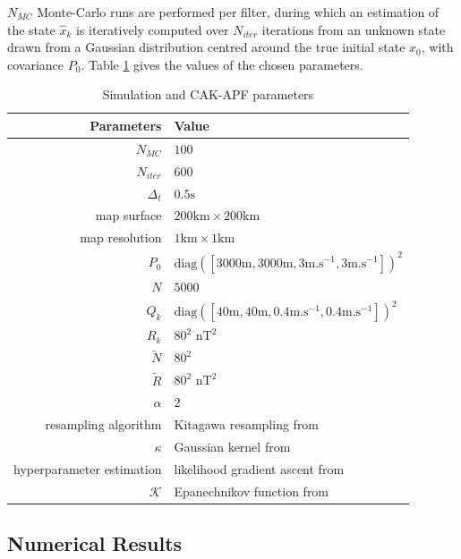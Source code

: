\documentclass[conference]{IEEEtran}
\begin{document}
$N_{MC}$ Monte-Carlo runs are performed per filter, during which an estimation of the state $\hat{x}_k$ is iteratively computed over $N_{iter}$ iterations from an unknown state drawn from a Gaussian distribution centred around the true initial state $x_0$, with covariance $P_0$. Table \ref{tab:parameters} gives the values of the chosen parameters.
\begin{table}[ht]
\renewcommand{\arraystretch}{1.1}
\centering \caption{Simulation and CAK-APF parameters} \label{tab:parameters}
\begin{tabular}{r|l}\hline
Parameters&Value\\\hline
$N_{MC}$&$100$\\
$N_{iter}$&$600$\\
$\Delta_t$&$0.5\text{s}$\\
map surface&$200\text{km}\times200\text{km}$\\
map resolution&$1\text{km}\times1\text{km}$\\
$P_0$&$\text{diag}([3000\text{m},3000\text{m},3\text{m.s}^{-1},3\text{m.s}^{-1}])^2$\\
$N$&$5000$\\
$Q_k$&$\text{diag}([40\text{m},40\text{m},0.4\text{m.s}^{-1},0.4\text{m.s}^{-1}])^2$\\
$R_k$&$80^2\text{ nT}^2$\\
$\tilde{N}$&$80^2$\\
$\tilde R$&$80^2\text{ nT}^2$\\
$\alpha$&$2$\\
resampling algorithm&Kitagawa resampling from \cite{bib:tuto}\\
$\kappa$&Gaussian kernel from \cite{bib:Rasmussen}\\
hyperparameter estimation&likelihood gradient ascent from \cite{bib:Rasmussen}\\
$\mathcal{K}$&Epanechnikov function from \cite{bib:Rasmussen}\\\hline
\end{tabular}
\end{table}

\subsection{Numerical Results}
\end{document}
